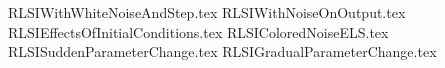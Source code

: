 {RLSIWithWhiteNoiseAndStep.tex}
{RLSIWithNoiseOnOutput.tex}
{RLSIEffectsOfInitialConditions.tex}
{RLSIColoredNoiseELS.tex}
{RLSISuddenParameterChange.tex}
{RLSIGradualParameterChange.tex}
